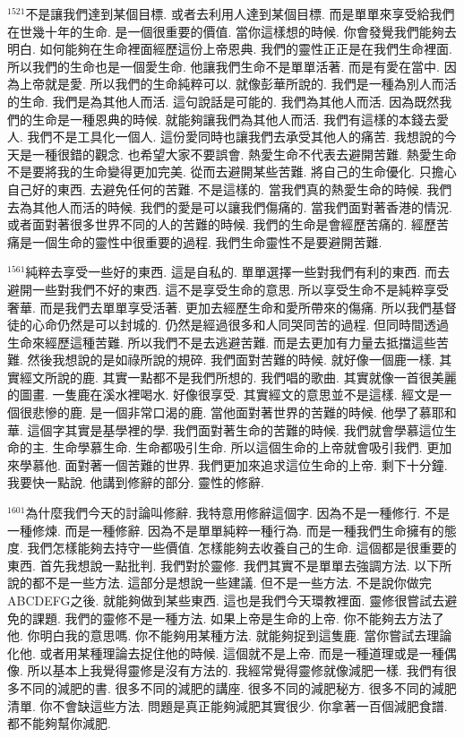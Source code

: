 \documentclass{book}
\begin{document}
$^{1521}$不是讓我們達到某個目標.
或者去利用人達到某個目標.
而是單單來享受給我們在世幾十年的生命.
是一個很重要的價值.
當你這樣想的時候.
你會發覺我們能夠去明白.
如何能夠在生命裡面經歷這份上帝恩典.
我們的靈性正正是在我們生命裡面.
所以我們的生命也是一個愛生命.
他讓我們生命不是單單活著.
而是有愛在當中.
因為上帝就是愛.
所以我們的生命純粹可以.
就像彭華所說的.
我們是一種為別人而活的生命.
我們是為其他人而活.
這句說話是可能的.
我們為其他人而活.
因為既然我們的生命是一種恩典的時候.
就能夠讓我們為其他人而活.
我們有這樣的本錢去愛人.
我們不是工具化一個人.
這份愛同時也讓我們去承受其他人的痛苦.
我想說的今天是一種很錯的觀念.
也希望大家不要誤會.
熱愛生命不代表去避開苦難.
熱愛生命不是要將我的生命變得更加完美.
從而去避開某些苦難.
將自己的生命優化.
只擔心自己好的東西.
去避免任何的苦難.
不是這樣的.
當我們真的熱愛生命的時候.
我們去為其他人而活的時候.
我們的愛是可以讓我們傷痛的.
當我們面對著香港的情況.
或者面對著很多世界不同的人的苦難的時候.
我們的生命是會經歷苦痛的.
經歷苦痛是一個生命的靈性中很重要的過程.
我們生命靈性不是要避開苦難.

$^{1561}$純粹去享受一些好的東西.
這是自私的.
單單選擇一些對我們有利的東西.
而去避開一些對我們不好的東西.
這不是享受生命的意思.
所以享受生命不是純粹享受奢華.
而是我們去單單享受活著.
更加去經歷生命和愛所帶來的傷痛.
所以我們基督徒的心命仍然是可以封城的.
仍然是經過很多和人同哭同苦的過程.
但同時間透過生命來經歷這種苦難.
所以我們不是去逃避苦難.
而是去更加有力量去抵擋這些苦難.
然後我想說的是如祿所說的規碎.
我們面對苦難的時候.
就好像一個鹿一樣.
其實經文所說的鹿.
其實一點都不是我們所想的.
我們唱的歌曲.
其實就像一首很美麗的圖畫.
一隻鹿在溪水裡喝水.
好像很享受.
其實經文的意思並不是這樣.
經文是一個很悲慘的鹿.
是一個非常口渴的鹿.
當他面對著世界的苦難的時候.
他學了慕耶和華.
這個字其實是基學裡的學.
我們面對著生命的苦難的時候.
我們就會學慕這位生命的主.
生命學慕生命.
生命都吸引生命.
所以這個生命的上帝就會吸引我們.
更加來學慕他.
面對著一個苦難的世界.
我們更加來追求這位生命的上帝.
剩下十分鐘.
我要快一點說.
他講到修辭的部分.
靈性的修辭.

$^{1601}$為什麼我們今天的討論叫修辭.
我特意用修辭這個字.
因為不是一種修行.
不是一種修煉.
而是一種修辭.
因為不是單單純粹一種行為.
而是一種我們生命擁有的態度.
我們怎樣能夠去持守一些價值.
怎樣能夠去收養自己的生命.
這個都是很重要的東西.
首先我想說一點批判.
我們對於靈修.
我們其實不是單單去強調方法.
以下所說的都不是一些方法.
這部分是想說一些建議.
但不是一些方法.
不是說你做完ABCDEFG之後.
就能夠做到某些東西.
這也是我們今天環教裡面.
靈修很嘗試去避免的課題.
我們的靈修不是一種方法.
如果上帝是生命的上帝.
你不能夠去方法了他.
你明白我的意思嗎.
你不能夠用某種方法.
就能夠捉到這隻鹿.
當你嘗試去理論化他.
或者用某種理論去捉住他的時候.
這個就不是上帝.
而是一種道理或是一種偶像.
所以基本上我覺得靈修是沒有方法的.
我經常覺得靈修就像減肥一樣.
我們有很多不同的減肥的書.
很多不同的減肥的講座.
很多不同的減肥秘方.
很多不同的減肥清單.
你不會缺這些方法.
問題是真正能夠減肥其實很少.
你拿著一百個減肥食譜.
都不能夠幫你減肥.
\end{document}
